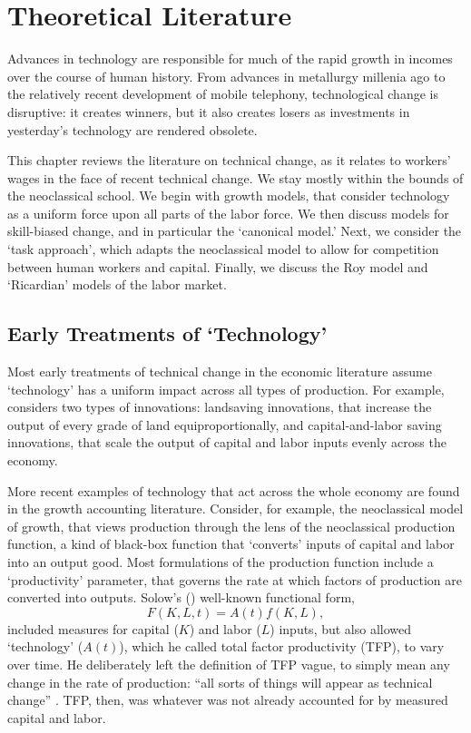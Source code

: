 \chapter{Theoretical Literature}\label{ch:2}

Advances in technology are responsible for much of the rapid growth in incomes over the course of human history. From advances in metallurgy millenia ago to the relatively recent development of mobile telephony, technological change is disruptive: it creates winners, but it also creates losers as investments in yesterday's technology are rendered obsolete.

This chapter reviews the literature on technical change, as it relates to workers' wages in the face of recent technical change. We stay mostly within the bounds of the neoclassical school. We begin with growth models, that consider technology as a uniform force upon all parts of the labor force. We then discuss models for skill-biased change, and in particular the `canonical model.' Next, we consider the `task approach', which adapts the neoclassical model to allow for competition between human workers and capital. Finally, we discuss the Roy model and `Ricardian' models of the labor market.

\section{Early Treatments of `Technology'}

Most early treatments of technical change in the economic literature assume `technology' has a uniform impact across all types of production. For example, \citet{Ricardo1819} considers two types of innovations: landsaving innovations, that increase the output of every grade of land equiproportionally, and capital-and-labor saving innovations, that scale the output of capital and labor inputs evenly across the economy. 

More recent examples of technology that act across the whole economy are found in the growth accounting literature. Consider, for example, the neoclassical model of growth, that views production through the lens of the neoclassical production function, a kind of black-box function that `converts' inputs of capital and labor into an output good. Most formulations of the production function include a `productivity' parameter, that governs the rate at which factors of production are converted into outputs. Solow's (\citeyear{Solow1957}) well-known functional form, \begin{equation}\label{eq:solow}
F(K,L,t)=A(t)f(K,L),
\end{equation}
included measures for capital ($K$) and labor ($L$) inputs, but also allowed `technology' ($A(t)$), which he called total factor productivity (TFP), to vary over time. He deliberately left the definition of TFP vague, to simply mean any change in the rate of production: ``all sorts of things will appear as technical change'' \citep[p.312]{Solow1957}. TFP, then, was whatever was not already accounted for by measured capital and labor.

